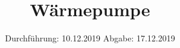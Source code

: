 

\subject{Versuchsnummer: 206}
\title{Wärmepumpe}
\date{%
  Durchführung: 10.12.2019
  \hspace{3em}
  Abgabe: 17.12.2019
}



\maketitle
\thispagestyle{empty}
\tableofcontents
\newpage







\newpage
\nocite{*}
\printbibliography


